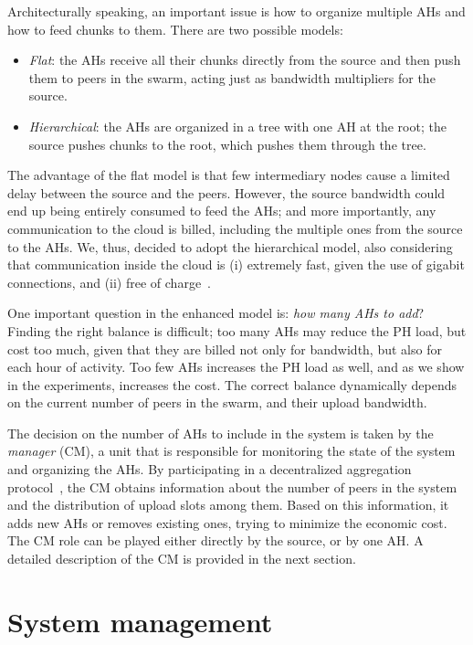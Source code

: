 Architecturally speaking, an important issue is how to organize multiple AHs
and how to feed chunks to them. There are two possible models:
\begin{itemize}
\item \emph{Flat}: the AHs receive all their chunks directly from the source
and then push them to peers in the swarm, acting just as bandwidth multipliers
for the source.
\item \emph{Hierarchical}: the AHs are organized in a tree with one AH at the
root; the source pushes chunks to the root, which pushes them through the
tree.
\end{itemize}

The advantage of the flat model is that few intermediary nodes cause a limited
delay between the source and the peers. However, the source bandwidth could
end up being entirely consumed to feed the AHs; and more importantly, any
communication to the cloud is billed, including the multiple ones from the
source to the AHs. We, thus, decided to adopt the hierarchical model, also
considering that communication inside the cloud is (i) extremely fast, given
the use of gigabit connections, and (ii) free of
charge~\cite{armbrust2010view}.

One important question in the enhanced model is: \emph{how many AHs to add}?
Finding the right balance is difficult; too many AHs may reduce the PH load,
but cost too much, given that they are billed not only for bandwidth, but 
also for each hour of activity. Too few AHs increases the PH load as well, and as we show in the
experiments, increases the cost. The correct balance dynamically depends on
the current number of peers in the swarm, and their upload bandwidth.

The decision on the number of AHs to include in the system is taken by the
\emph{\clive manager} (CM), a unit that is responsible for monitoring the
state of the system and organizing the AHs. By participating in a
decentralized aggregation protocol~\cite{aggregation}, the CM obtains
information about the number of peers in the system and the distribution of
upload slots among them. Based on this information, it adds new AHs or removes
existing ones, trying to minimize the economic cost. The CM role can be played
either directly by the source, or by one AH. A detailed description of the CM
is provided in the next section.

\section{System management} \label{sec:cmmanager}

